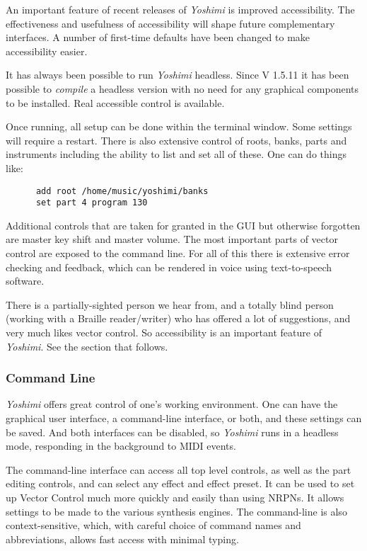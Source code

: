 \documentclass[
 11pt,
 twoside,
 a4paper,
 final                                 %
]{article}
\begin{document}
   An important feature of recent releases of \textsl{Yoshimi} is improved
   accessibility. The effectiveness and usefulness of accessibility will
   shape future complementary interfaces. A number of first-time defaults
   have been changed to make accessibility easier.

   It has always been possible to run \textsl{Yoshimi} headless. Since V
   1.5.11 it has been possible to \textsl{compile} a headless version with
   no need for any graphical components to be installed. Real accessible
   control is available.

   Once running, all setup can be done within the terminal window.
   Some settings will require a restart.
   There is also extensive control of
   roots, banks, parts and instruments including the ability to list and set
   all of these. One can do things like:

   \begin{verbatim}
      add root /home/music/yoshimi/banks
      set part 4 program 130
   \end{verbatim}

   Additional controls that are taken for granted in the GUI but
   otherwise forgotten are master key shift and master volume.  The
   most important parts of vector control are exposed to the command line.
   For all of this there is extensive error checking and feedback, which can be
   rendered in voice using text-to-speech software.

   There is a partially-sighted person we hear from, and
   a totally blind person (working with a Braille reader/writer) who has
   offered a lot of suggestions, and very much likes vector control.  So
   accessibility  is an important feature of
   \textsl{Yoshimi}.  See the section that follows.

\subsubsection{Command Line}
\label{subsubsec:new_features_command_line}

   \textsl{Yoshimi} offers great control of one's working environment.
   One can have the graphical user interface, a command-line
   interface, or both, and these settings can be saved.  And both
   interfaces can be disabled, so \textsl{Yoshimi} runs in a headless
   mode, responding in the background to MIDI events.

   The command-line interface can access all top level controls, as well as the
   part editing controls, and can select any effect and effect preset.  It can be
   used to set up Vector Control much more quickly and easily than using NRPNs.
   It allows settings to be made to the various synthesis engines.
   The command-line is also context-sensitive, which, with careful choice
   of command names and abbreviations, allows fast access with minimal
   typing.
\end{document}
